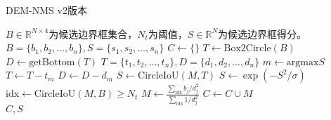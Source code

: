 \begin{algorithm}[H]
  \caption{DEM-NMS v2版本}
  \label{alg:dem-nms v2}
  \begin{algorithmic}[1]
  \Require $B\in\mathbb{R}^{N\times4}$为候选边界框集合，$N_t$为阈值，$S\in\mathbb{R}^N$为候选边界框得分。\\
  $B=\{b_1,b_2,\ldots,b_n\},S=\{s_1,s_2,\ldots,s_n\}$
  \State $C \gets \{\}$
  \State $T \gets \mathrm{Box2Circle}(B)$
  \State $D \gets \mathrm{getBottom}(T)$ 
  \State $T=\{t_1,t_2,\ldots,t_n\}, D=\{d_1,d_2,\ldots,d_n\}$
    \State $m \gets \mathrm{argmax} S$
    \State $T \gets T - t_m$
    \State $D \gets D - d_m$
    \State $S \gets \mathrm{CircleIoU}(M,T)$ 
    \State $S \gets \exp\left(-S^2/\sigma\right)$ 
    \State $\mathrm{idx} \gets \mathrm{CircleIoU}(M,B)\ge N_t$ 
    \State $\displaystyle M \gets \frac{\sum_{\mathrm{idx}}b_j/d^2_j}{\sum_{\mathrm{idx}}1/d_j^2}$ 
    \State $C \gets C\cup M$
  \EndWhile \\
  \Return $C, S$
  \end{algorithmic}
\end{algorithm}